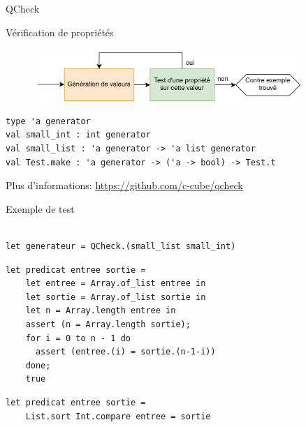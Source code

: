 
\begin{frame}[fragile]{QCheck}
    
Vérification de propriétés

\begin{figure}
    \centering
    \includegraphics[width=0.9\textwidth]{slides/images/qcheck.drawio.png}
\end{figure}


\begin{lstlisting}
type 'a generator
val small_int : int generator
val small_list : 'a generator -> 'a list generator
val Test.make : 'a generator -> ('a -> bool) -> Test.t
\end{lstlisting}

Plus d'informations: \url{https://github.com/c-cube/qcheck}


    
\end{frame}

\begin{frame}[fragile]{Exemple de test}

\begin{lstlisting}

let generateur = QCheck.(small_list small_int)
\end{lstlisting}

\begin{lstlisting}
let predicat entree sortie =
    let entree = Array.of_list entree in
    let sortie = Array.of_list sortie in
    let n = Array.length entree in
    assert (n = Array.length sortie);
    for i = 0 to n - 1 do
      assert (entree.(i) = sortie.(n-1-i))
    done;
    true
\end{lstlisting}

\begin{lstlisting}
let predicat entree sortie =
    List.sort Int.compare entree = sortie
\end{lstlisting}

\end{frame}

